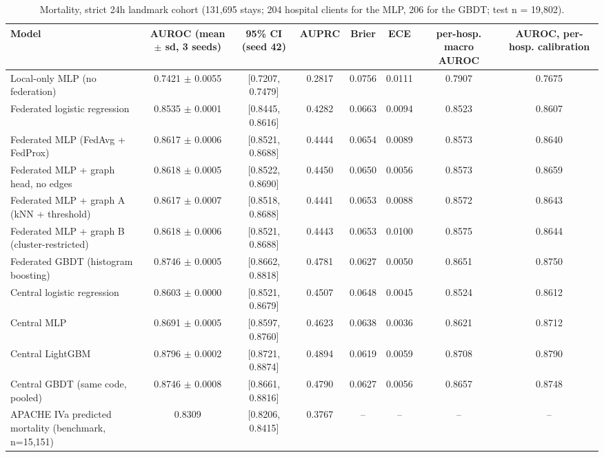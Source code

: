 \begin{table}[t]
\centering\small
\caption{Mortality, strict 24h landmark cohort (131,695 stays; 204 hospital clients for the MLP, 206 for the GBDT; test n = 19,802).}\label{tab:mort_strict}
\begin{tabular}{lccccccc}
\toprule
Model & AUROC (mean $\pm$ sd, 3 seeds) & 95\% CI (seed 42) & AUPRC & Brier & ECE & per-hosp. macro AUROC & AUROC, per-hosp. calibration \\
\midrule
Local-only MLP (no federation) & 0.7421 $\pm$ 0.0055 & [0.7207, 0.7479] & 0.2817 & 0.0756 & 0.0111 & 0.7907 & 0.7675 \\
Federated logistic regression & 0.8535 $\pm$ 0.0001 & [0.8445, 0.8616] & 0.4282 & 0.0663 & 0.0094 & 0.8523 & 0.8607 \\
Federated MLP (FedAvg + FedProx) & 0.8617 $\pm$ 0.0006 & [0.8521, 0.8688] & 0.4444 & 0.0654 & 0.0089 & 0.8573 & 0.8640 \\
Federated MLP + graph head, no edges & 0.8618 $\pm$ 0.0005 & [0.8522, 0.8690] & 0.4450 & 0.0650 & 0.0056 & 0.8573 & 0.8659 \\
Federated MLP + graph A (kNN + threshold) & 0.8617 $\pm$ 0.0007 & [0.8518, 0.8688] & 0.4441 & 0.0653 & 0.0088 & 0.8572 & 0.8643 \\
Federated MLP + graph B (cluster-restricted) & 0.8618 $\pm$ 0.0006 & [0.8521, 0.8688] & 0.4443 & 0.0653 & 0.0100 & 0.8575 & 0.8644 \\
Federated GBDT (histogram boosting) & 0.8746 $\pm$ 0.0005 & [0.8662, 0.8818] & 0.4781 & 0.0627 & 0.0050 & 0.8651 & 0.8750 \\
Central logistic regression & 0.8603 $\pm$ 0.0000 & [0.8521, 0.8679] & 0.4507 & 0.0648 & 0.0045 & 0.8524 & 0.8612 \\
Central MLP & 0.8691 $\pm$ 0.0005 & [0.8597, 0.8760] & 0.4623 & 0.0638 & 0.0036 & 0.8621 & 0.8712 \\
Central LightGBM & 0.8796 $\pm$ 0.0002 & [0.8721, 0.8874] & 0.4894 & 0.0619 & 0.0059 & 0.8708 & 0.8790 \\
Central GBDT (same code, pooled) & 0.8746 $\pm$ 0.0008 & [0.8661, 0.8816] & 0.4790 & 0.0627 & 0.0056 & 0.8657 & 0.8748 \\
APACHE IVa predicted mortality (benchmark, n=15,151) & 0.8309 & [0.8206, 0.8415] & 0.3767 & – & – & – & – \\
\bottomrule
\end{tabular}
\end{table}

